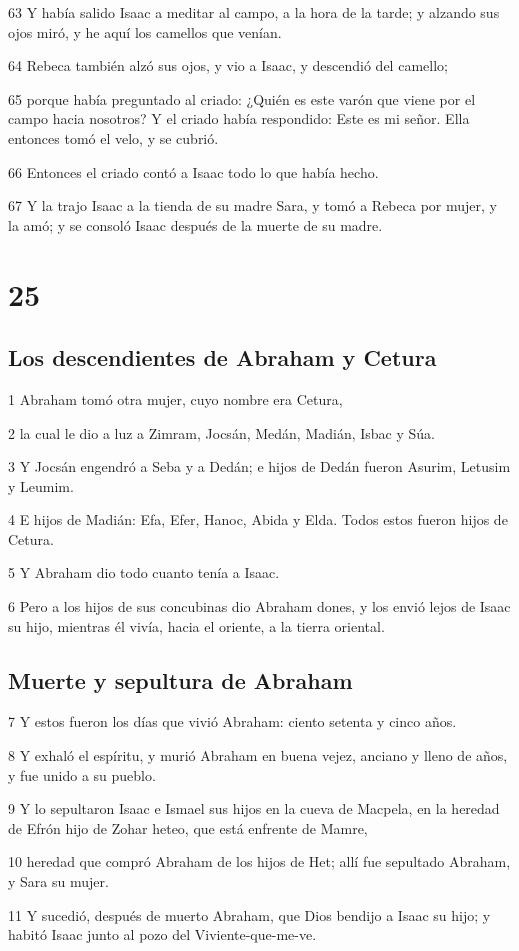 \par 63 Y había salido Isaac a meditar al campo, a la hora de la tarde; y alzando sus ojos miró, y he aquí los camellos que venían.
\par 64 Rebeca también alzó sus ojos, y vio a Isaac, y descendió del camello;
\par 65 porque había preguntado al criado: ¿Quién es este varón que viene por el campo hacia nosotros? Y el criado había respondido: Este es mi señor. Ella entonces tomó el velo, y se cubrió.
\par 66 Entonces el criado contó a Isaac todo lo que había hecho.
\par 67 Y la trajo Isaac a la tienda de su madre Sara, y tomó a Rebeca por mujer, y la amó; y se consoló Isaac después de la muerte de su madre.

\chapter{25}

\section*{Los descendientes de Abraham y Cetura}

\par 1 Abraham tomó otra mujer, cuyo nombre era Cetura,
\par 2 la cual le dio a luz a Zimram, Jocsán, Medán, Madián, Isbac y Súa.
\par 3 Y Jocsán engendró a Seba y a Dedán; e hijos de Dedán fueron Asurim, Letusim y Leumim.
\par 4 E hijos de Madián: Efa, Efer, Hanoc, Abida y Elda. Todos estos fueron hijos de Cetura.
\par 5 Y Abraham dio todo cuanto tenía a Isaac.
\par 6 Pero a los hijos de sus concubinas dio Abraham dones, y los envió lejos de Isaac su hijo, mientras él vivía, hacia el oriente, a la tierra oriental.

\section*{Muerte y sepultura de Abraham}

\par 7 Y estos fueron los días que vivió Abraham: ciento setenta y cinco años.
\par 8 Y exhaló el espíritu, y murió Abraham en buena vejez, anciano y lleno de años, y fue unido a su pueblo.
\par 9 Y lo sepultaron Isaac e Ismael sus hijos en la cueva de Macpela, en la heredad de Efrón hijo de Zohar heteo, que está enfrente de Mamre,
\par 10 heredad que compró Abraham de los hijos de Het; allí fue sepultado Abraham, y Sara su mujer.
\par 11 Y sucedió, después de muerto Abraham, que Dios bendijo a Isaac su hijo; y habitó Isaac junto al pozo del Viviente-que-me-ve.

